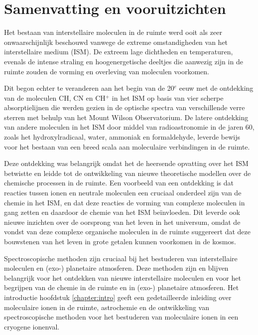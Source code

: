 \chapter{Samenvatting en vooruitzichten}

{
Het bestaan van interstellaire moleculen in de ruimte werd ooit als zeer onwaarschijnlijk beschouwd vanwege de extreme omstandigheden van het interstellaire medium (ISM). De extreem lage dichtheden en temperaturen, evenals de intense straling en hoogenergetische deeltjes die aanwezig zijn in de ruimte zouden de vorming en overleving van moleculen voorkomen. 

Dit begon echter te veranderen aan het begin van de 20$^e$ eeuw met de ontdekking van de moleculen CH, CN en CH$^+$ in het ISM op basis van vier scherpe absorptielijnen die werden gezien in de optische spectra van verschillende verre sterren met behulp van het Mount Wilson Observatorium. De latere ontdekking van andere moleculen in het ISM door middel van radioastronomie in de jaren 60, zoals het hydroxylradicaal, water, ammoniak en formaldehyde, leverde bewijs voor het bestaan van een breed scala aan moleculaire verbindingen in de ruimte. 

Deze ontdekking was belangrijk omdat het de heersende opvatting over het ISM betwistte en leidde tot de ontwikkeling van nieuwe theoretische modellen over de chemische processen in de ruimte. Een voorbeeld van een ontdekking is dat reacties tussen ionen en neutrale moleculen een cruciaal onderdeel zijn van de chemie in het ISM, en dat deze reacties de vorming van complexe moleculen in gang zetten en daardoor de chemie van het ISM beïnvloeden. Dit leverde ook nieuwe inzichten over de oorsprong van het leven in het universum, omdat de vondst van deze complexe organische moleculen in de ruimte suggereert dat deze bouwstenen van het leven in grote getalen kunnen voorkomen in de kosmos.

Spectroscopische methoden zijn cruciaal bij het bestuderen van interstellaire moleculen en (exo-) planetaire atmosferen. Deze methoden zijn en blijven belangrijk voor het ontdekken van nieuwe interstellaire moleculen en voor het begrijpen van de chemie in de ruimte en in (exo-) planetaire atmosferen. Het introductie hoofdstuk \ref{chapter:intro} geeft een gedetailleerde inleiding over moleculaire ionen in de ruimte, astrochemie en de ontwikkeling van spectroscopische methoden voor het bestuderen van moleculaire ionen in een cryogene ionenval.

}
